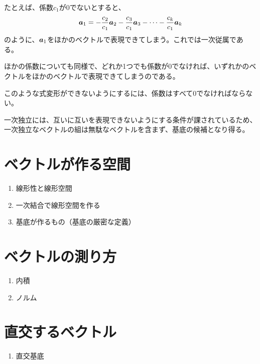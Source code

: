 \documentclass[../imaging-math]{subfiles}
\begin{document}
たとえば、係数$c_1$が$0$でないとすると、
\begin{equation*}
  \vb*{a}_1 = -\frac{c_2}{c_1} \vb*{a}_2 - \frac{c_3}{c_1} \vb*{a}_3 - \cdots - \frac{c_k}{c_1} \vb*{a}_{k}
\end{equation*}
のように、$\vb*{a}_1$をほかのベクトルで表現できてしまう。これでは一次従属である。

ほかの係数についても同様で、どれか1つでも係数が$0$でなければ、いずれかのベクトルをほかのベクトルで表現できてしまうのである。

このような式変形ができないようにするには、係数はすべて$0$でなければならない。

\br

一次独立には、互いに互いを表現できないようにする条件が課されているため、一次独立なベクトルの組は無駄なベクトルを含まず、基底の候補となり得る。

\section{ベクトルが作る空間}

\begin{mindflow}
  \begin{enumerate}
    \item 線形性と線形空間
    \item 一次結合で線形空間を作る
    \item 基底が作るもの（基底の厳密な定義）
  \end{enumerate}
\end{mindflow}

\section{ベクトルの測り方}

\begin{mindflow}
  \begin{enumerate}
    \item 内積
    \item ノルム
  \end{enumerate}
\end{mindflow}

\section{直交するベクトル}

\begin{mindflow}
  \begin{enumerate}
    \item 直交基底
  \end{enumerate}
\end{mindflow}
\end{document}
